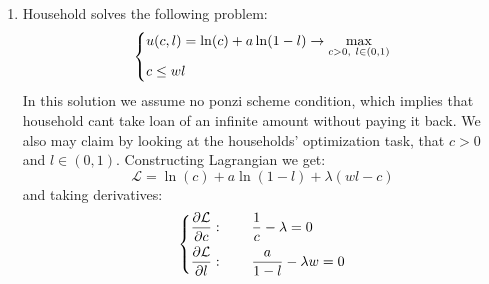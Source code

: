 \documentclass[11pt, oneside]{article}
\begin{document}
\begin{enumerate}[(1)]
	\item Household solves the following problem:
	\[
	\begin{dcases}
		u(c, l) = \ln(c) + a\ln(1-l) \to \max_{c >0,~ l \in(0, 1)} \\
		c \le wl
	\end{dcases}
	\]
	In this solution we assume no ponzi scheme condition, which implies that household cant take loan of an infinite amount without paying it back. We also may claim by looking at the households' optimization task, that $ c >0 $ and $ l \in (0, 1) $. Constructing Lagrangian we get:
	\[
	\mathcal{L} = \ln(c) + a\ln(1-l) + \lambda \left( wl - c\right)
	\]
	and taking derivatives:
	\[
	\begin{dcases}
		\frac{\partial \mathcal{L}}{\partial c}: \quad\quad \frac{1}{c} - \lambda =0 \\
		\frac{\partial \mathcal{L}}{\partial l}: \quad\quad \frac{a}{1-l} -\lambda w = 0
	\end{dcases}
	\]


\end{enumerate}
\end{document}
